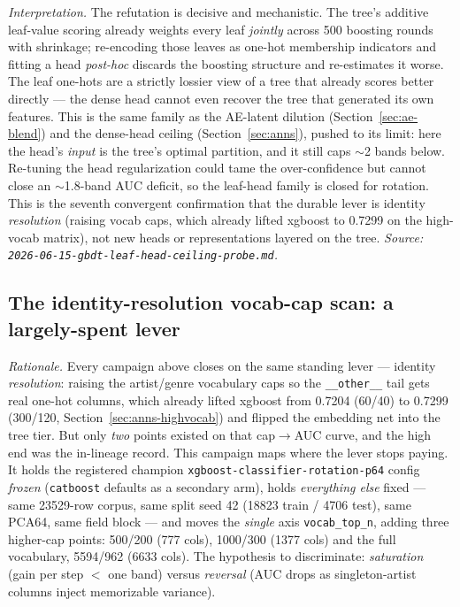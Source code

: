 \documentclass[11pt]{article}
\begin{document}
\emph{Interpretation.} The refutation is decisive and mechanistic. The tree's
additive leaf-value scoring already weights every leaf \emph{jointly} across 500
boosting rounds with shrinkage; re-encoding those leaves as one-hot membership
indicators and fitting a head \emph{post-hoc} discards the boosting structure
and re-estimates it worse. The leaf one-hots are a strictly lossier view of a
tree that already scores better directly --- the dense head cannot even recover
the tree that generated its own features. This is the same family as the
AE-latent dilution (Section~\ref{sec:ae-blend}) and the dense-head ceiling
(Section~\ref{sec:anns}), pushed to its limit: here the head's \emph{input} is
the tree's optimal partition, and it still caps $\sim$2 bands below. Re-tuning
the head regularization could tame the over-confidence but cannot close an
$\sim$1.8-band AUC deficit, so the leaf-head family is closed for rotation. This
is the seventh convergent confirmation that the durable lever is identity
\emph{resolution} (raising vocab caps, which already lifted xgboost to
\num{0.7299} on the high-vocab matrix), not new heads or representations layered
on the tree.
\emph{Source: \texttt{2026-06-15-gbdt-leaf-head-ceiling-probe.md}.}

\subsection{The identity-resolution vocab-cap scan: a largely-spent lever}
\label{sec:vocab-cap}
\emph{Rationale.} Every campaign above closes on the same standing lever ---
identity \emph{resolution}: raising the artist/genre vocabulary caps so the
\texttt{\_\_other\_\_} tail gets real one-hot columns, which already lifted
xgboost from \num{0.7204} (60/40) to \num{0.7299} (300/120,
Section~\ref{sec:anns-highvocab}) and flipped the embedding net into the tree
tier. But only \emph{two} points existed on that cap$\to$AUC curve, and the
high end was the in-lineage record. This campaign maps where the lever stops
paying. It holds the registered champion \texttt{xgboost-classifier-rotation-p64}
config \emph{frozen} (\texttt{catboost} defaults as a secondary arm), holds
\emph{everything else} fixed --- same \num{23529}-row corpus, same split seed 42
(\num{18823} train / \num{4706} test), same PCA64, same field block --- and
moves the \emph{single} axis \texttt{vocab\_top\_n}, adding three higher-cap
points: 500/200 (777 cols), 1000/300 (1377 cols) and the full vocabulary,
5594/962 (6633 cols). The hypothesis to discriminate: \emph{saturation} (gain
per step $<$ one band) versus \emph{reversal} (AUC drops as singleton-artist
columns inject memorizable variance).
\end{document}
